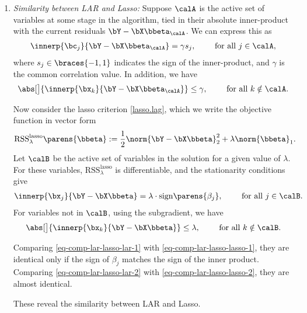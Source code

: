 \documentclass[12pt]{article}
\begin{document}
\begin{enumerate}[label=\textbf{\arabic*.}]
\begin{enumerate}
		\item \textit{Similarity between LAR and Lasso:} Suppose $\calA$ is the active set of variables at some stage in the algorithm, tied in their absolute inner-product with the current residuals $\bY - \bX \bbeta_{\calA}$. We can express this as 
		\begin{align}\label{eq-comp-lar-lasso-lar-1}
			\innerp{\bc_j}{\bY - \bX \bbeta_{\calA}} = \gamma s_j, \qquad \text{ for all } j \in \calA, 
		\end{align}
		where $s_j \in \braces{-1, 1}$ indicates the sign of the inner-product, and $\gamma$ is the common correlation value. In addition, we have 
		\begin{align}\label{eq-comp-lar-lasso-lar-2}
			\abs[\big]{\innerp{\bx_k}{\bY - \bX \bbeta_{\calA}}} \le \gamma, \qquad \text{ for all } k \notin \calA. 
		\end{align}
		
		Now consider the lasso criterion \eqref{lasso.lag}, which we write the objective function in vector form 
		\begin{align*}
			\mathrm{RSS}_{\lambda}^{\mathrm{lasso}} \parens{\bbeta} := \frac{1}{2} \norm{\bY - \bX \bbeta}_2^2 + \lambda \norm{\bbeta}_1. 
		\end{align*}
		Let $\calB$ be the active set of variables in the solution for a given value of $\lambda$. For these variables, $\mathrm{RSS}_{\lambda}^{\mathrm{lasso}}$ is differentiable, and the stationarity conditions give 
		\begin{align}\label{eq-comp-lar-lasso-lasso-1}
			\innerp{\bx_j}{\bY - \bX \bbeta} = \lambda \cdot \mathrm{sign} \parens{\beta_j}, \qquad \text{ for all } j \in \calB. 
		\end{align}
		For variables not in $\calB$, using the subgradient, we have 
		\begin{align}\label{eq-comp-lar-lasso-lasso-2}
			\abs[\big]{\innerp{\bx_k}{\bY - \bX \bbeta}} \le \lambda, \qquad \text{ for all } k \notin \calB. 
		\end{align}
		
		Comparing \eqref{eq-comp-lar-lasso-lar-1} with \eqref{eq-comp-lar-lasso-lasso-1}, they are identical only if the sign of $\beta_j$ matches the sign of the inner product. Comparing \eqref{eq-comp-lar-lasso-lar-2} with \eqref{eq-comp-lar-lasso-lasso-2}, they are almost identical. 
		
		These reveal the similarity between LAR and Lasso. 
		
	\end{enumerate} 
	

\end{enumerate}
\end{document}
